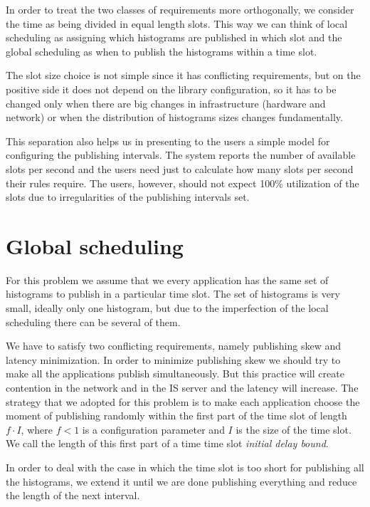 In order to treat the two classes of requirements more orthogonally, we consider the time as being divided in equal length slots. This way we can think of local scheduling as assigning which histograms are published in which slot and the global scheduling as when to publish the histograms within a time slot.

The slot size choice is not simple since it has conflicting requirements, but on the positive side it does not depend on the library configuration, so it has to be changed only when there are big changes in infrastructure (hardware and network) or when the distribution of histograms sizes changes fundamentally.

This separation also helps us in presenting to the users a simple model for configuring the publishing intervals. The system reports the number of available slots per second and the users need just to calculate how many slots per second their rules require. The users, however, should not expect 100\% utilization of the slots due to irregularities of the publishing intervals set.

\section{Global scheduling}

For this problem we assume that we every application has the same set of histograms to publish in a particular time slot. The set of histograms is very small, ideally only one histogram, but due to the imperfection of the local scheduling there can be several of them.

We have to satisfy two conflicting requirements, namely publishing skew and latency minimization. In order to minimize publishing skew we should try to make all the applications publish simultaneously. But this practice will create contention in the network and in the IS server and the latency will increase. 
The strategy that we adopted for this problem is to make each application choose the moment of publishing randomly within the first part of the time slot of length $f\cdot I$, where $f<1$ is a configuration parameter and $I$ is the size of the time slot. We call the length of this first part of a time time slot \emph{initial delay bound}.

In order to deal with the case in which the time slot is too short for publishing all the histograms, we extend it until we are done publishing everything and reduce the length of the next interval.

